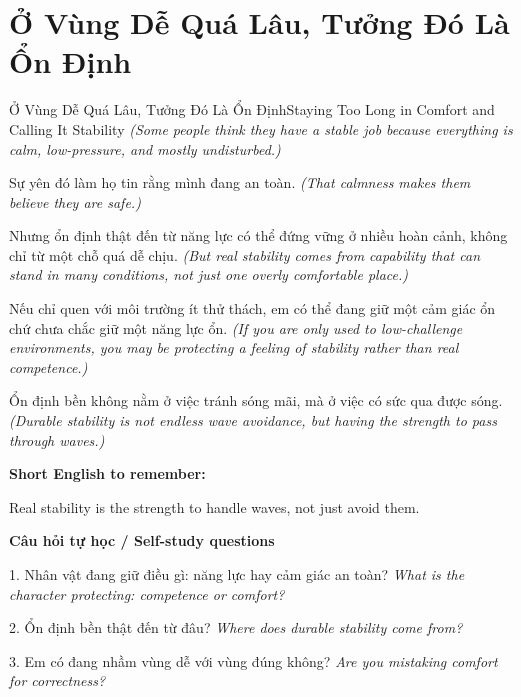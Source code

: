 \section{Ở Vùng Dễ Quá Lâu, Tưởng Đó Là Ổn Định}
\begin{truyen}{Ở Vùng Dễ Quá Lâu, Tưởng Đó Là Ổn Định}{Staying Too Long in Comfort and Calling It Stability}
\textit{(Some people think they have a stable job because everything is calm, low-pressure, and mostly undisturbed.)}

Sự yên đó làm họ tin rằng mình đang an toàn.
\textit{(That calmness makes them believe they are safe.)}

Nhưng ổn định thật đến từ năng lực có thể đứng vững ở nhiều hoàn cảnh, không chỉ từ một chỗ quá dễ chịu.
\textit{(But real stability comes from capability that can stand in many conditions, not just one overly comfortable place.)}

Nếu chỉ quen với môi trường ít thử thách, em có thể đang giữ một cảm giác ổn chứ chưa chắc giữ một năng lực ổn.
\textit{(If you are only used to low-challenge environments, you may be protecting a feeling of stability rather than real competence.)}

\end{truyen}

\begin{baihoc}
Ổn định bền không nằm ở việc tránh sóng mãi, mà ở việc có sức qua được sóng.
\textit{(Durable stability is not endless wave avoidance, but having the strength to pass through waves.)}
\end{baihoc}

\begin{ghinhoanh}
\textbf{Short English to remember:}

Real stability is the strength to handle waves, not just avoid them.

\end{ghinhoanh}

\begin{tuhocnhanh}
\textbf{Câu hỏi tự học / Self-study questions}

1. Nhân vật đang giữ điều gì: năng lực hay cảm giác an toàn? \textit{What is the character protecting: competence or comfort?}

2. Ổn định bền thật đến từ đâu? \textit{Where does durable stability come from?}

3. Em có đang nhầm vùng dễ với vùng đúng không? \textit{Are you mistaking comfort for correctness?}
\end{tuhocnhanh}
\ngancach

